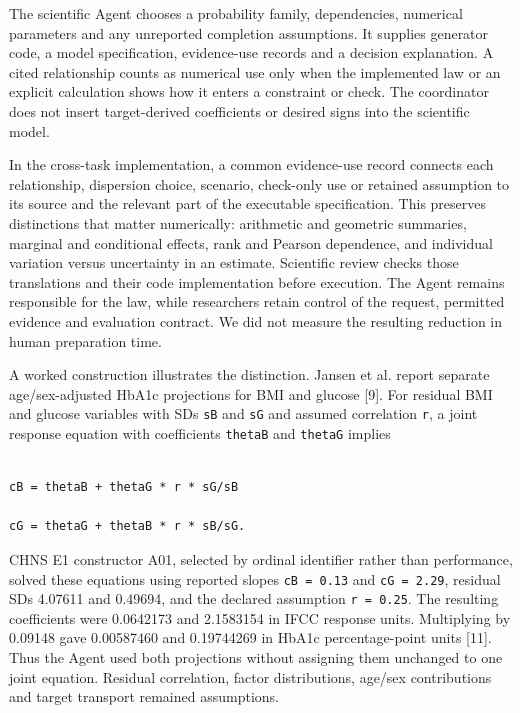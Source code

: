 \documentclass[10pt,twocolumn]{article}
\begin{document}
The scientific Agent chooses a probability family, dependencies, numerical parameters and any unreported completion assumptions. It supplies generator code, a model specification, evidence-use records and a decision explanation. A cited relationship counts as numerical use only when the implemented law or an explicit calculation shows how it enters a constraint or check. The coordinator does not insert target-derived coefficients or desired signs into the scientific model.


In the cross-task implementation, a common evidence-use record connects each relationship, dispersion choice, scenario, check-only use or retained assumption to its source and the relevant part of the executable specification. This preserves distinctions that matter numerically: arithmetic and geometric summaries, marginal and conditional effects, rank and Pearson dependence, and individual variation versus uncertainty in an estimate. Scientific review checks those translations and their code implementation before execution. The Agent remains responsible for the law, while researchers retain control of the request, permitted evidence and evaluation contract. We did not measure the resulting reduction in human preparation time.


A worked construction illustrates the distinction. Jansen et al. report separate age/sex-adjusted HbA1c projections for BMI and glucose [9]. For residual BMI and glucose variables with SDs \texttt{sB} and \texttt{sG} and assumed correlation \texttt{r}, a joint response equation with coefficients \texttt{thetaB} and \texttt{thetaG} implies


\begin{lstlisting}

cB = thetaB + thetaG * r * sG/sB

cG = thetaG + thetaB * r * sB/sG.

\end{lstlisting}

CHNS E1 constructor A01, selected by ordinal identifier rather than performance, solved these equations using reported slopes \texttt{cB = 0.13} and \texttt{cG = 2.29}, residual SDs 4.07611 and 0.49694, and the declared assumption \texttt{r = 0.25}. The resulting coefficients were 0.0642173 and 2.1583154 in IFCC response units. Multiplying by 0.09148 gave 0.00587460 and 0.19744269 in HbA1c percentage-point units [11]. Thus the Agent used both projections without assigning them unchanged to one joint equation. Residual correlation, factor distributions, age/sex contributions and target transport remained assumptions.
\end{document}
